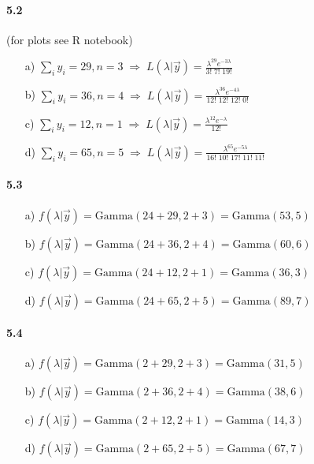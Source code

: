 \documentclass[fontsize=11pt,DIV=18,parskip=half]{scrartcl}
\begin{document}
\paragraph{5.2} (for plots see R notebook)

\begin{enumerate}
\item[a)] $\displaystyle{\sum_i} y_i = 29, n=3 \; \Rightarrow \; L(\lambda|\vec{y}) = \displaystyle{\frac{\lambda^{29} e^{-3\lambda}}{3!\;7!\;19!}}$
\item[b)] $\displaystyle{\sum_i} y_i = 36, n=4 \; \Rightarrow \; L(\lambda|\vec{y}) = \displaystyle{\frac{\lambda^{36} e^{-4\lambda}}{12!\;12!\;12!\;0!}}$
\item[c)] $\displaystyle{\sum_i} y_i = 12, n=1 \; \Rightarrow \; L(\lambda|\vec{y}) = \displaystyle{\frac{\lambda^{12} e^{-\lambda}}{12!}}$
\item[d)] $\displaystyle{\sum_i} y_i = 65, n=5 \; \Rightarrow \; L(\lambda|\vec{y}) = \displaystyle{\frac{\lambda^{65} e^{-5\lambda}}{16!\;10!\;17!\;11!\;11!}}$
\end{enumerate}

\paragraph{5.3}

\begin{enumerate}
\item[a)] $f(\lambda|\vec{y}) = \text{Gamma}(24+29,2+3) = \text{Gamma}(53,5)$
\item[b)] $f(\lambda|\vec{y}) = \text{Gamma}(24+36,2+4) = \text{Gamma}(60,6)$
\item[c)] $f(\lambda|\vec{y}) = \text{Gamma}(24+12,2+1) = \text{Gamma}(36,3)$
\item[d)] $f(\lambda|\vec{y}) = \text{Gamma}(24+65,2+5) = \text{Gamma}(89,7)$
\end{enumerate}

\paragraph{5.4}

\begin{enumerate}
\item[a)] $f(\lambda|\vec{y}) = \text{Gamma}(2+29,2+3) = \text{Gamma}(31,5)$
\item[b)] $f(\lambda|\vec{y}) = \text{Gamma}(2+36,2+4) = \text{Gamma}(38,6)$
\item[c)] $f(\lambda|\vec{y}) = \text{Gamma}(2+12,2+1) = \text{Gamma}(14,3)$
\item[d)] $f(\lambda|\vec{y}) = \text{Gamma}(2+65,2+5) = \text{Gamma}(67,7)$
\end{enumerate}
\end{document}
